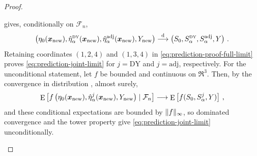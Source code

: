\documentclass{article}
\makeatletter
\DeclareMathOperator{\expect}{E}
\theoremstyle{definition}
\newcommand{\vnorm}[1]{%
	\ensuremath{%
		\if@display
		\left\| #1 \right\|
		\else
		\| #1 \|
		\fi
	}%
}
\newcommand*{\bb}{\boldsymbol}
\def\bx{\bb{x}}
\makeatother
\begin{document}
\begin{bibunit}
\begin{proof}
\begin{enumerate}[label=(\roman*)]
    gives, conditionally on $\mathcal F_n$, 
    \begin{equation}
    \label{eq:prediction-proof-full-limit}
        \left(
            \eta_0(\bx_{\rm new}),
            \hat\eta_\alpha^{\textrm{\tiny DY}}(\bx_{\rm new}),
            \hat\eta_\alpha^{\textrm{adj}}(\bx_{\rm new}),
            Y_{\rm new}
        \right)
        \overset{\mathrm d}{\longrightarrow}
        \left(
            S_0,
            S_\alpha^{\textrm{\tiny DY}},
            S_\alpha^{\textrm{adj}},
            Y
        \right)\,.
    \end{equation}
    Retaining coordinates $(1,2,4)$ and $(1,3,4)$ in
    \eqref{eq:prediction-proof-full-limit} proves
    \eqref{eq:prediction-joint-limit} for $j=\mathrm{DY}$ and
    $j=\mathrm{adj}$, respectively. For the unconditional statement, let $f$
    be bounded and continuous on $\Re^3$. Then, by the convergence in distribution \citep[Chapter~2.10,~Definition~4]{shiryaev:2016}, almost surely, 
    $$
        \expect\left[
            f\left(
                \eta_0(\bx_{\rm new}),
                \hat\eta_\alpha^j(\bx_{\rm new}),
                Y_{\rm new}
            \right)
            \mid
            \mathcal F_n
        \right]
        \longrightarrow
        \expect\left[
            f(S_0,S_\alpha^j,Y)
        \right]\,,
    $$
    and these conditional expectations are bounded by $\vnorm{f}_\infty$, so
    dominated convergence \citep[Chapter~2.6,~Theorem~3]{shiryaev:2016} and the tower property \citep[Chapter~3.8~Equation~(4)]{shiryaev:2016} give
    \eqref{eq:prediction-joint-limit} unconditionally.


\end{enumerate}
\end{proof}
\end{bibunit}
\end{document}
